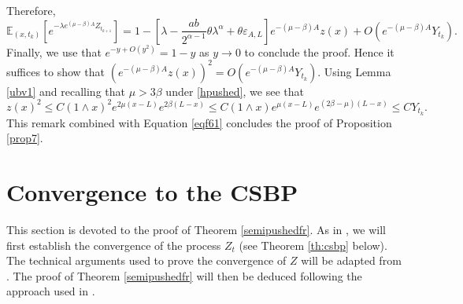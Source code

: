 \documentclass[11pt]{article}
\theoremstyle{plain}
\newcommand\vep{\varepsilon}
\begin{document}
Therefore,
\begin{equation}
\mathbb{E}_{(x,t_k)}\left[e^{-\lambda e^{(\mu-\beta)A}Z^{}_{t_{k+1}}}\right]=1-\left[\lambda  -\frac{ab}{2^{\alpha-1}}\theta\lambda^\alpha + \theta \vep_{A,L}\right]e^{-(\mu-\beta)A}z(x)+O\left(e^{-(\mu-\beta)A}Y_{t_k}\right).\label{eqf61}
\end{equation}
Finally, we use that $e^{-y+O(y^2)}=1-y$ as $y\to0$ to conclude the proof. Hence it suffices to show that $\left(e^{-(\mu-\beta)A}z(x)\right)^2=O(e^{-(\mu-\beta)A}Y_{t_k})$.
Using Lemma \ref{ubv1} and recalling that $\mu>3\beta$ under \eqref{hpushed}, we see  that 
\begin{equation*}
z(x)^2\leqslant C(1\wedge x)^2e^{2\mu(x-L)}e^{2\beta(L-x)}\leqslant C(1\wedge x)e^{\mu(x-L)}e^{(2\beta -\mu)(L-x)}\leqslant CY_{t_k}.
\end{equation*}
This remark combined with Equation \eqref{eqf61} concludes the proof of Proposition \ref{prop7}.
 			
			
\section{Convergence to the CSBP}\label{sec:cvcsbp}
\setcounter{equation}{0}
This section is devoted to the proof of Theorem \ref{semipushedfr}.
As in \cite{Berestycki2010}, we will first  establish the convergence of the process $Z_t$ (see Theorem \ref{th:csbp} below). The technical arguments used to prove the convergence of $Z$ will be adapted from \cite[Section 8]{Maillard:2020aa}. The proof of Theorem \ref{semipushedfr} will then be deduced following the approach used in \cite{Berestycki2010}. 





\end{document}
